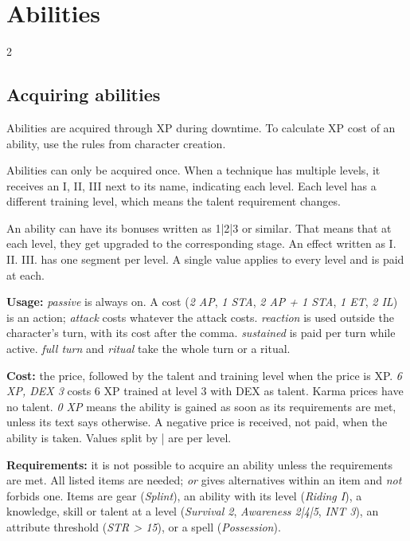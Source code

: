 \chapter{Abilities}

\begin{multicols}{2}

\section{Acquiring abilities}

Abilities are acquired through XP during downtime. To calculate XP cost of an ability, use the rules from character creation.

Abilities can only be acquired once. When a technique has multiple levels, it receives an I, II, III next to its name, indicating each level. Each level has a different training level, which means the talent requirement changes. 

An ability can have its bonuses written as 1|2|3 or similar. That means that at each level, they get upgraded to the corresponding stage. An effect written as I. II. III. has one segment per level. A single value applies to every level and is paid at each.

\textbf{Usage:} \textit{passive} is always on. A cost (\textit{2 AP}, \textit{1 STA}, \textit{2 AP + 1 STA}, \textit{1 ET}, \textit{2 IL}) is an action; \textit{attack} costs whatever the attack costs. \textit{reaction} is used outside the character's turn, with its cost after the comma. \textit{sustained} is paid per turn while active. \textit{full turn} and \textit{ritual} take the whole turn or a ritual.

\textbf{Cost:} the price, followed by the talent and training level when the price is XP. \textit{6 XP, DEX 3} costs 6 XP trained at level 3 with DEX as talent. Karma prices have no talent. \textit{0 XP} means the ability is gained as soon as its requirements are met, unless its text says otherwise. A negative price is received, not paid, when the ability is taken. Values split by | are per level.

\textbf{Requirements:} it is not possible to acquire an ability unless the requirements are met. All listed items are needed; \textit{or} gives alternatives within an item and \textit{not} forbids one. Items are gear (\textit{Splint}), an ability with its level (\textit{Riding I}), a knowledge, skill or talent at a level (\textit{Survival 2}, \textit{Awareness 2|4|5}, \textit{INT 3}), an attribute threshold (\textit{STR > 15}), or a spell (\textit{Possession}).


\end{multicols}
